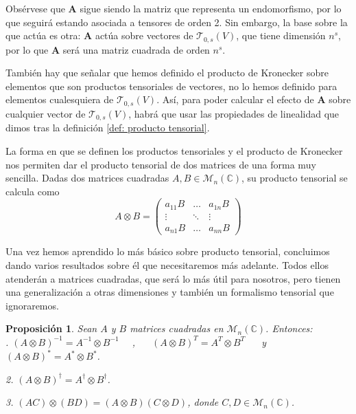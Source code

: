 \documentclass[11pt,a4paper,twoside,pdf]{article}
\numberwithin{equation}{section}
\newtheorem{proposition}{Proposición}
\begin{document}
		Obsérvese que $\mathbf{A}$ sigue siendo la matriz que representa un endomorfismo, por lo que seguirá estando asociada a tensores de orden 2. Sin embargo, la base sobre la que actúa es otra: $\mathbf{A}$ actúa sobre vectores de $\mathcal{T}_{0,s}(V)$, que tiene dimensión $n^s$, por lo que $\mathbf{A}$ será una matriz cuadrada de orden $n^s$.
		
		También hay que señalar que hemos definido el producto de Kronecker sobre elementos que son productos tensoriales de vectores, no lo hemos definido para elementos cualesquiera de $\mathcal{T}_{0,s}(V)$. Así, para poder calcular el efecto de $\mathbf{A}$ sobre cualquier vector de $\mathcal{T}_{0,s}(V)$, habrá que usar las propiedades de linealidad que dimos tras la definición \ref{def: producto tensorial}.
		
		La forma en que se definen los productos tensoriales y el producto de Kronecker nos permiten dar el producto tensorial de dos matrices de una forma muy sencilla. Dadas dos matrices cuadradas $A, B \in \mathcal{M}_n(\mathbb{C})$, su producto tensorial se calcula como
			\begin{equation} \label{eq: producto tensorial}
				A \otimes B =\left(  \begin{array}{ccc}
				a_{11}B 	 & \hdots & a_{1n}B \\
				\vdots  	 & \ddots  & \vdots \\
				a_{n1}B  & \hdots & a_{nn}B
				\end{array}						\right) 
			\end{equation}
		
		Una vez hemos aprendido lo más básico sobre producto tensorial, concluimos dando varios resultados sobre él que necesitaremos más adelante. Todos ellos atenderán a matrices cuadradas, que será lo más útil para nosotros, pero tienen una generalización a otras dimensiones y también un formalismo tensorial que ignoraremos.
		
		\begin{proposition}
			Sean $A$ y $B$ matrices cuadradas en $\mathcal{M}_n(\mathbb{C})$. Entonces:\\
			. $(A\otimes B)^{-1} = A^{-1} \otimes B^{-1}$ $\quad$, $\quad$
			$(A\otimes B)^T = A^T \otimes B^T$ $\quad$ y $\quad$
			$(A\otimes B)^* = A^* \otimes B^*$.
			
			2. $(A\otimes B)^\dagger = A^\dagger \otimes B^\dagger$.
			
			3. $(AC)\otimes (BD) =(A\otimes B)(C\otimes D)$, donde $C,D\in \mathcal{M}_n(\mathbb{C})$.
		\end{proposition}
		
\end{document}
